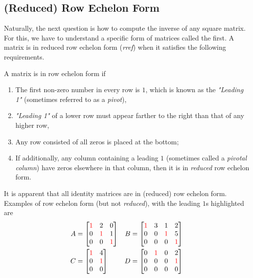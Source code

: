 \subsection{(Reduced) Row Echelon Form}
\label{section:echelon}
Naturally, the next question is how to compute the inverse of any square matrix. For this, we have to understand a specific form of matrices called the  first. A matrix is in reduced row echelon form (\textit{rref}) when it satisfies the following requirements.
\begin{defn}
\label{defn:rref}
A matrix is in row echelon form if
\begin{enumerate}
\item The first non-zero number in every row is $1$, which is known as the \textit{"Leading 1"} (sometimes referred to as a \textit{pivot}),
\item \textit{"Leading 1"} of a lower row must appear farther to the right than that of any higher row,
\item Any row consisted of all zeros is placed at the bottom;
\item If additionally, any column containing a leading $1$ (sometimes called a \textit{pivotal column}) have zeros elsewhere in that column, then it is in \textit{reduced} row echelon form.
\end{enumerate}
\end{defn}
It is apparent that all identity matrices are in (reduced) row echelon form. Examples of row echelon form (but not \textit{reduced}), with the leading $1$s highlighted are
\begin{align*}
A &=
\begin{bmatrix}
\textcolor{red}{1} & 2 & 0 \\
0 & \textcolor{red}{1} & 1 \\
0 & 0 & \textcolor{red}{1}
\end{bmatrix}
& B &=
\begin{bmatrix}
\textcolor{red}{1} & 3 & 1 & 2 \\
0 & 0 & \textcolor{red}{1} & 5 \\
0 & 0 & 0 & \textcolor{red}{1}
\end{bmatrix} \\
C &=
\begin{bmatrix}
\textcolor{red}{1} & 4 \\
0 & \textcolor{red}{1} \\
0 & 0 
\end{bmatrix}
& D &=
\begin{bmatrix}
0 & \textcolor{red}{1} & 0 & 2 \\
0 & 0 & 0 & \textcolor{red}{1} \\
0 & 0 & 0 & 0
\end{bmatrix}
\end{align*}
